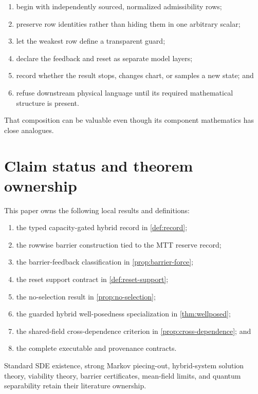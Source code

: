 \documentclass[11pt]{article}
\theoremstyle{definition}
\theoremstyle{remark}
\begin{document}
\begin{enumerate}[leftmargin=2em]
\item begin with independently sourced, normalized admissibility rows;
\item preserve row identities rather than hiding them in one arbitrary
      scalar;
\item let the weakest row define a transparent guard;
\item declare the feedback and reset as separate model layers;
\item record whether the result stops, changes chart, or samples a new
      state; and
\item refuse downstream physical language until its required mathematical
      structure is present.
\end{enumerate}

That composition can be valuable even though its component mathematics has
close analogues.

\section{Claim status and theorem ownership}
\label{sec:status}

This paper owns the following local results and definitions:

\begin{enumerate}[leftmargin=2em]
\item the typed capacity-gated hybrid record in \cref{def:record};
\item the rowwise barrier construction tied to the MTT reserve record;
\item the barrier-feedback classification in
      \cref{prop:barrier-force};
\item the reset support contract in \cref{def:reset-support};
\item the no-selection result in \cref{prop:no-selection};
\item the guarded hybrid well-posedness specialization in
      \cref{thm:wellposed};
\item the shared-field cross-dependence criterion in
      \cref{prop:cross-dependence}; and
\item the complete executable and provenance contracts.
\end{enumerate}

Standard SDE existence, strong Markov piecing-out, hybrid-system solution
theory, viability theory, barrier certificates, mean-field limits, and
quantum separability retain their literature ownership.
\end{document}
